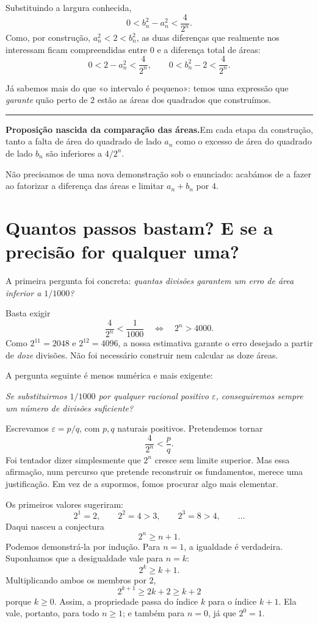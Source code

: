 \documentclass[11pt,a4paper]{article}
\newcommand{\questao}[1]{\par\medskip\noindent\textit{#1}\par\smallskip}
\newcommand{\assentado}[2]{%
\par\medskip\noindent\begingroup\color{azul}\rule{\linewidth}{0.45pt}\par\smallskip
\noindent\textbf{#1.}\enspace #2\par\endgroup\medskip}
\begin{document}
Substituindo a largura conhecida,
\[
\boxed{0<b_n^2-a_n^2<\frac4{2^n}.}
\]
Como, por construção, $a_n^2<2<b_n^2$, as duas diferenças que realmente nos interessam ficam compreendidas entre $0$ e a diferença total de áreas:
\[
0<2-a_n^2<\frac4{2^n},
\qquad
0<b_n^2-2<\frac4{2^n}.
\]

Já sabemos mais do que «o intervalo é pequeno»: temos uma expressão que \emph{garante} quão perto de $2$ estão as áreas dos quadrados que construímos.

\assentado{Proposição nascida da comparação das áreas}{Em cada etapa da construção, tanto a falta de área do quadrado de lado $a_n$ como o excesso de área do quadrado de lado $b_n$ são inferiores a $4/2^n$.}

Não precisamos de uma nova demonstração sob o enunciado: acabámos de a fazer ao fatorizar a diferença das áreas e limitar $a_n+b_n$ por $4$.

\section{Quantos passos bastam? E se a precisão for qualquer uma?}

A primeira pergunta foi concreta: \emph{quantas divisões garantem um erro de área inferior a $1/1000$?}

Basta exigir
\[
\frac4{2^n}<\frac1{1000}
\quad\Longleftrightarrow\quad
2^n>4000.
\]
Como $2^{11}=2048$ e $2^{12}=4096$, a nossa estimativa garante o erro desejado a partir de \emph{doze} divisões. Não foi necessário construir nem calcular as doze áreas.

A pergunta seguinte é menos numérica e mais exigente:

\questao{Se substituirmos $1/1000$ por qualquer racional positivo $\varepsilon$, conseguiremos sempre um número de divisões suficiente?}

Escrevamos $\varepsilon=p/q$, com $p,q$ naturais positivos. Pretendemos tornar
\[
\frac4{2^n}<\frac pq.
\]
Foi tentador dizer simplesmente que $2^n$ cresce sem limite superior. Mas essa afirmação, num percurso que pretende reconstruir os fundamentos, merece uma justificação. Em vez de a supormos, fomos procurar algo mais elementar.

Os primeiros valores sugeriram:
\[
2^1=2,\qquad 2^2=4>3,\qquad 2^3=8>4,\qquad\ldots
\]
Daqui nasceu a conjectura
\[
2^n\ge n+1.
\]
Podemos demonstrá-la por indução. Para $n=1$, a igualdade é verdadeira. Suponhamos que a desigualdade vale para $n=k$:
\[
2^k\ge k+1.
\]
Multiplicando ambos os membros por $2$,
\[
2^{k+1}\ge2k+2\ge k+2
\]
porque $k\ge0$. Assim, a propriedade passa do índice $k$ para o índice $k+1$. Ela vale, portanto, para todo $n\ge1$; e também para $n=0$, já que $2^0=1$.
\end{document}
